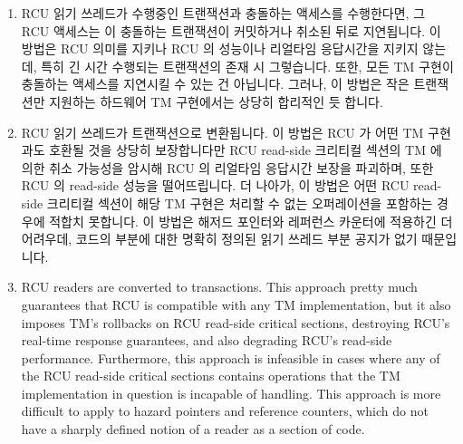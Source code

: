 \begin{enumerate}
\fi

\item	RCU 읽기 쓰레드가 수행중인 트랜잭션과 충돌하는 액세스를 수행한다면, 그
	RCU 액세스는 이 충돌하는 트랜잭션이 커밋하거나 취소된 뒤로 지연됩니다.
	이 방법은 RCU 의미를 지키나 RCU 의 성능이나 리얼타임 응답시간을 지키지
	않는데, 특히 긴 시간 수행되는 트랜잭션의 존재 시 그렇습니다.
	또한, 모든 TM 구현이 충돌하는 액세스를 지연시킬 수 있는 건 아닙니다.
	그러나, 이 방법은 작은 트랜잭션만 지원하는 하드웨어 TM 구현에서는
	상당히 합리적인 듯 합니다.

\item	RCU 읽기 쓰레드가 트랜잭션으로 변환됩니다.
	이 방법은 RCU 가 어떤 TM 구현과도 호환될 것을 상당히 보장합니다만 RCU
	read-side 크리티컬 섹션의 TM 에 의한 취소 가능성을 암시해 RCU 의
	리얼타임 응답시간 보장을 파괴하며, 또한 RCU 의 read-side 성능을
	떨어뜨립니다.
	더 나아가, 이 방법은 어떤 RCU read-side 크리티컬 섹션이 해당 TM 구현은
	처리할 수 없는 오퍼레이션을 포함하는 경우에 적합치 못합니다.
	이 방법은 해저드 포인터와 레퍼런스 카운터에 적용하긴 더 어려우데,
	코드의 부분에 대한 명확히 정의된 읽기 쓰레드 부분 공지가 없기
	때문입니다.

\iffalse

\item	RCU readers are converted to transactions.
	This approach pretty much guarantees that RCU is compatible with
	any TM implementation, but it also imposes TM's rollbacks on RCU
	read-side critical sections, destroying RCU's real-time response
	guarantees, and also degrading RCU's read-side performance.
	Furthermore, this approach is infeasible in cases where any of
	the RCU read-side critical sections contains operations that
	the TM implementation in question is incapable of handling.
	This approach is more difficult to apply to hazard pointers and
	reference counters, which do not have a sharply defined notion
	of a reader as a section of code.


\end{enumerate}
